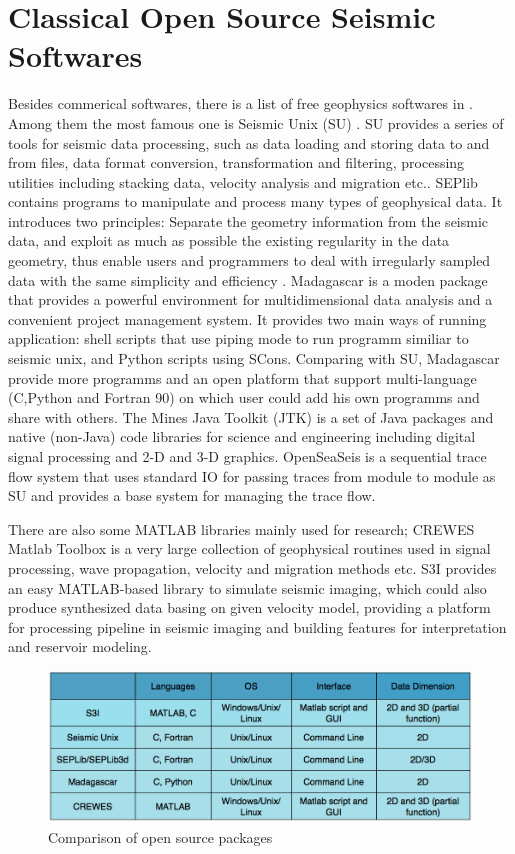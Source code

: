 \section{Classical Open Source Seismic Softwares}
Besides commerical softwares, there is a list of free geophysics softwares in \cite{listofgeosw}. Among them the most famous one is Seismic Unix (SU) \cite{SUHome}. SU provides a series of tools for seismic data processing, such as data loading and storing data to and from files, data format conversion, transformation and filtering, processing utilities including stacking data, velocity analysis and migration etc.\cite{SUManual}. SEPlib \cite{SEPlibHome} contains programs to manipulate and process many types of geophysical data. It introduces two principles: Separate the geometry information from the seismic data, and exploit as much as possible the existing regularity in the data geometry, thus enable users and programmers to deal with irregularly sampled data with the same simplicity and efficiency \cite{SEPManual}. Madagascar \cite{MadagascarHome} is a moden package that provides a powerful environment for multidimensional data analysis and a convenient project management system. It provides two main ways of running application: shell scripts that use piping mode to run programm similiar to seismic unix, and Python scripts using SCons. Comparing with SU, Madagascar provide more programms and an open platform that support multi-language (C,Python and Fortran 90) on which user could add his own programms and share with others. The Mines Java Toolkit (JTK) \cite{JTKHome} is a set of Java packages and native (non-Java) code libraries for science and engineering including digital signal processing and 2-D and 3-D graphics. OpenSeaSeis \cite{OpenSeaSeis} is a sequential trace flow system that uses standard I\/O for passing traces from module to module as SU and provides a base system for managing the trace flow.

There are also some MATLAB libraries mainly used for research; CREWES Matlab Toolbox \cite{CREWESMatlab} is a very large collection of geophysical routines used in signal processing, wave propagation, velocity and migration methods etc. S3I \cite{CeGPS3I} provides an easy MATLAB-based library to simulate seismic imaging, which could also produce synthesized data basing on given velocity model, providing a platform for processing pipeline in seismic imaging and building features for interpretation and reservoir modeling.  

\begin{figure}[h]
\centering
\includegraphics[scale=.42]{figures/open_package_list.png}
\caption{Comparison of open source packages\cite{CeGPS3I}}
\label{open_package_list}
\end{figure}

